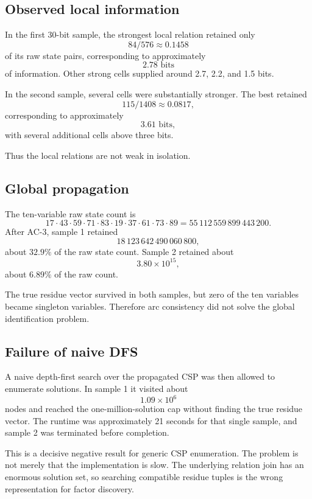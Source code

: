 \documentclass[11pt,a4paper]{article}
\begin{document}
\subsection{Observed local information}
In the first 30-bit sample, the strongest local relation retained only
\[
84/576\approx0.1458
\]
of its raw state pairs, corresponding to approximately
\[
2.78\text{ bits}
\]
of information. Other strong cells supplied around 2.7, 2.2, and 1.5 bits.

In the second sample, several cells were substantially stronger. The best retained
\[
115/1408\approx0.0817,
\]
corresponding to approximately
\[
3.61\text{ bits},
\]
with several additional cells above three bits.

Thus the local relations are not weak in isolation.

\subsection{Global propagation}
The ten-variable raw state count is
\[
17\cdot43\cdot59\cdot71\cdot83\cdot19\cdot37\cdot61\cdot73\cdot89
=55\,112\,559\,899\,443\,200.
\]
After AC-3, sample 1 retained
\[
18\,123\,642\,490\,060\,800,
\]
about \(32.9\%\) of the raw state count. Sample 2 retained about
\[
3.80\times10^{15},
\]
about \(6.89\%\) of the raw count.

The true residue vector survived in both samples, but zero of the ten variables became singleton variables. Therefore arc consistency did not solve the global identification problem.

\subsection{Failure of naive DFS}
A naive depth-first search over the propagated CSP was then allowed to enumerate solutions. In sample 1 it visited about
\[
1.09\times10^6
\]
nodes and reached the one-million-solution cap without finding the true residue vector. The runtime was approximately 21 seconds for that single sample, and sample 2 was terminated before completion.

This is a decisive negative result for generic CSP enumeration. The problem is not merely that the implementation is slow. The underlying relation join has an enormous solution set, so searching compatible residue tuples is the wrong representation for factor discovery.
\end{document}
